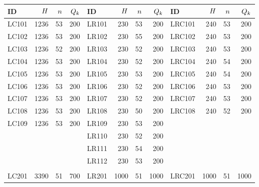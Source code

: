 \newpage
\begin{center}
\begin{longtable}{lrrr|lrrr|lrrr}

        \hline
        ID & $H$ & $n$ & $Q_{k}$ & 
        ID & $H$ & $n$ & $Q_{k}$ & 
        ID & $H$ & $n$ & $Q_{k}$ \\ 
        \hline
        LC101      & 1236 &  53 & 200 & LR101      &  230 &  53 &  200 & LRC101      &  240 &  53 &  200\\
        LC102      & 1236 &  53 & 200 & LR102      &  230 &  55 &  200 & LRC102      &  240 &  53 &  200\\
        LC103      & 1236 &  52 & 200 & LR103      &  230 &  52 &  200 & LRC103      &  240 &  53 &  200\\
        LC104      & 1236 &  53 & 200 & LR104      &  230 &  52 &  200 & LRC104      &  240 &  54 &  200\\
        LC105      & 1236 &  53 & 200 & LR105      &  230 &  53 &  200 & LRC105      &  240 &  54 &  200\\
        LC106      & 1236 &  53 & 200 & LR106      &  230 &  52 &  200 & LRC106      &  240 &  53 &  200\\
        LC107      & 1236 &  53 & 200 & LR107      &  230 &  52 &  200 & LRC107      &  240 &  53 &  200\\
        LC108      & 1236 &  53 & 200 & LR108      &  230 &  50 &  200 & LRC108      &  240 &  52 &  200\\
        LC109      & 1236 &  53 & 200 & LR109      &  230 &  53 &  200 &             &      &     &     \\ 
                   &      &     &     & LR110      &  230 &  52 &  200 &             &      &     &     \\ 
                   &      &     &     & LR111      &  230 &  54 &  200 &             &      &     &     \\
                   &      &     &     & LR112      &  230 &  53 &  200 &             &      &     &     \\
                   &      &     &     &            &      &     &      &             &      &     &     \\
        LC201      & 3390 &  51 & 700 & LR201      & 1000 &  51 & 1000 & LRC201      & 1000 &  51 & 1000\\

\end{longtable}
\end{center}
